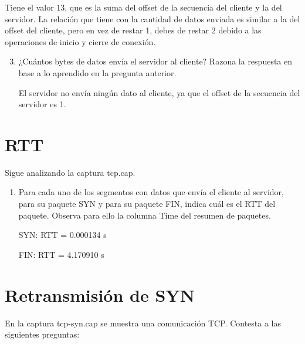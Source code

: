 \documentclass[12pt, a4paper]{report}
\begin{document}
Tiene el valor 13, que es la suma del offset de la secuencia del cliente y la del servidor. La relación que tiene con la cantidad de datos enviada es similar a la del offset del cliente, pero en vez de restar 1, debes de restar 2 debido a las operaciones de inicio y cierre de conexión.

\begin{enumerate}
	\setcounter{enumi}{2}
	\item ¿Cuántos bytes de datos envía el servidor al cliente? Razona la respuesta en base a lo aprendido en la pregunta anterior.
	
	El servidor no envía ningún dato al cliente, ya que el offset de la secuencia del servidor es 1.
\end{enumerate}

\section{RTT}
Sigue analizando la captura tcp.cap.

\begin{enumerate}
	\item Para cada uno de los segmentos con datos que envía el cliente al servidor, para su paquete SYN y para su paquete FIN, indica cuál es el RTT del paquete. Observa para ello la columna Time del resumen de paquetes.
	
	SYN: RTT = 0.000134 s
	
	FIN: RTT = 4.170910 s
\end{enumerate}

\section{Retransmisión de SYN}
En la captura tcp-syn.cap se muestra una comunicación TCP. Contesta a las siguientes preguntas:
\end{document}
